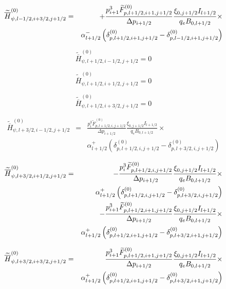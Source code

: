 \begin{eqnarray}
\widetilde{\overline{H}}_{\psi ,l-1/2,i+3/2,j+1/2}^{\left( 0\right) } &=&+%
\frac{p_{i+1}^{3}\widetilde{F}_{p,l+1/2,i+1,j+1/2}^{\left( 0\right) }}{%
\Delta p_{i+1/2}}\frac{\xi _{0,j+1/2}I_{l+1/2}}{q_{e}B_{0,l+1/2}}\times
\nonumber \\
&&\alpha _{l+1/2}^{-}\left( \delta _{p,l+1/2,i+1,j+1/2}^{(0)}-\delta
_{p,l-1/2,i+1,j+1/2}^{(0)}\right)
\end{eqnarray}

\begin{equation}
\widetilde{\overline{H}}_{\psi ,l+1/2,i-1/2,j+1/2}^{\left( 0\right) }=0
\end{equation}

\begin{equation}
\widetilde{\overline{H}}_{\psi ,l+1/2,i+1/2,j+1/2}^{\left( 0\right) }=0
\end{equation}

\begin{equation}
\widetilde{\overline{H}}_{\psi ,l+1/2,i+3/2,j+1/2}^{\left( 0\right) }=0
\end{equation}

\begin{eqnarray}
\widetilde{\overline{H}}_{\psi ,l+3/2,i-1/2,j+1/2}^{\left( 0\right) } &=&%
\frac{p_{i}^{3}\widetilde{F}_{p,l+1/2,i,j+1/2}^{\left( 0\right) }}{\Delta %
p_{i+1/2}}\frac{\xi _{0,j+1/2}I_{l+1/2}}{q_{e}B_{0,l+1/2}}\times   \nonumber
\\
&&\alpha _{l+1/2}^{+}\left( \delta _{p,l+1/2,i,j+1/2}^{(0)}-\delta
_{p,l+3/2,i,j+1/2}^{(0)}\right)
\end{eqnarray}

\begin{eqnarray}
\widetilde{\overline{H}}_{\psi ,l+3/2,i+1/2,j+1/2}^{\left( 0\right) } &=&-%
\frac{p_{i}^{3}\widetilde{F}_{p,l+1/2,i,j+1/2}^{\left( 0\right) }}{\Delta %
p_{i+1/2}}\frac{\xi _{0,j+1/2}I_{l+1/2}}{q_{e}B_{0,l+1/2}}\times   \nonumber
\\
&&\alpha _{l+1/2}^{+}\left( \delta _{p,l+1/2,i,j+1/2}^{(0)}-\delta
_{p,l+3/2,i,j+1/2}^{(0)}\right)   \nonumber \\
&&-\frac{p_{i+1}^{3}\widetilde{F}_{p,l+1/2,i+1,j+1/2}^{\left( 0\right) }}{%
\Delta p_{i+1/2}}\frac{\xi _{0,j+1/2}I_{l+1/2}}{q_{e}B_{0,l+1/2}}\times
\nonumber \\
&&\alpha _{l+1/2}^{+}\left( \delta _{p,l+1/2,i+1,j+1/2}^{(0)}-\delta
_{p,l+3/2,i+1,j+1/2}^{(0)}\right)
\end{eqnarray}

\begin{eqnarray}
\widetilde{\overline{H}}_{\psi ,l+3/2,i+3/2,j+1/2}^{\left( 0\right) } &=&%
\frac{p_{i+1}^{3}\widetilde{F}_{p,l+1/2,i+1,j+1/2}^{\left( 0\right) }}{%
\Delta p_{i+1/2}}\frac{\xi _{0,j+1/2}I_{l+1/2}}{q_{e}B_{0,l+1/2}}\times
\nonumber \\
&&\alpha _{l+1/2}^{+}\left( \delta _{p,l+1/2,i+1,j+1/2}^{(0)}-\delta
_{p,l+3/2,i+1,j+1/2}^{(0)}\right)
\end{eqnarray}
